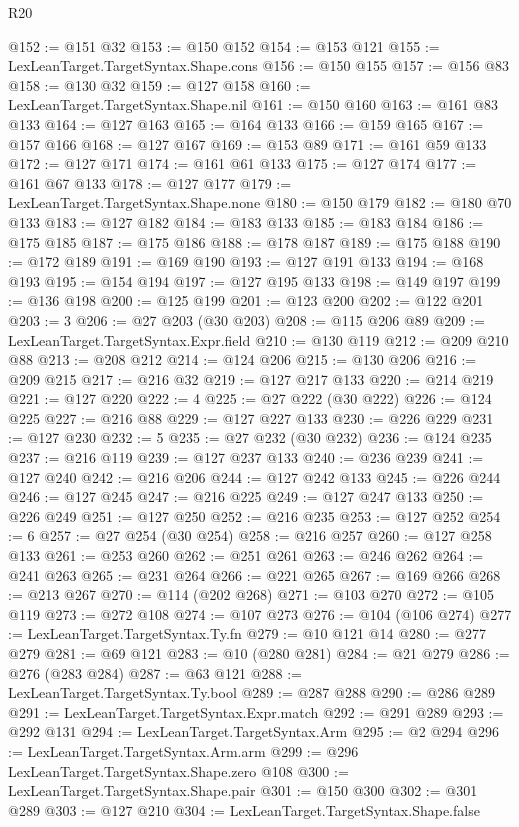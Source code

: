 \begin{lexlean}{R20}
\begin{coremodule}
{{{{{{{{{{{{{{{{{{{{{{{{{{{{{{{{{{{{{{{{{{{{{{{{{{{{{{{{{{{{{{{@152 := @151 @32
@153 := @150 @152
@154 := @153 @121
@155 := LexLeanTarget.TargetSyntax.Shape.cons
@156 := @150 @155
@157 := @156 @83
@158 := @130 @32
@159 := @127 @158
@160 := LexLeanTarget.TargetSyntax.Shape.nil
@161 := @150 @160
@163 := @161 @83 @133
@164 := @127 @163
@165 := @164 @133
@166 := @159 @165
@167 := @157 @166
@168 := @127 @167
@169 := @153 @89
@171 := @161 @59 @133
@172 := @127 @171
@174 := @161 @61 @133
@175 := @127 @174
@177 := @161 @67 @133
@178 := @127 @177
@179 := LexLeanTarget.TargetSyntax.Shape.none
@180 := @150 @179
@182 := @180 @70 @133
@183 := @127 @182
@184 := @183 @133
@185 := @183 @184
@186 := @175 @185
@187 := @175 @186
@188 := @178 @187
@189 := @175 @188
@190 := @172 @189
@191 := @169 @190
@193 := @127 @191 @133
@194 := @168 @193
@195 := @154 @194
@197 := @127 @195 @133
@198 := @149 @197
@199 := @136 @198
@200 := @125 @199
@201 := @123 @200
@202 := @122 @201
@203 := 3
@206 := @27 @203 (@30 @203)
@208 := @115 @206 @89
@209 := LexLeanTarget.TargetSyntax.Expr.field
@210 := @130 @119
@212 := @209 @210 @88
@213 := @208 @212
@214 := @124 @206
@215 := @130 @206
@216 := @209 @215
@217 := @216 @32
@219 := @127 @217 @133
@220 := @214 @219
@221 := @127 @220
@222 := 4
@225 := @27 @222 (@30 @222)
@226 := @124 @225
@227 := @216 @88
@229 := @127 @227 @133
@230 := @226 @229
@231 := @127 @230
@232 := 5
@235 := @27 @232 (@30 @232)
@236 := @124 @235
@237 := @216 @119
@239 := @127 @237 @133
@240 := @236 @239
@241 := @127 @240
@242 := @216 @206
@244 := @127 @242 @133
@245 := @226 @244
@246 := @127 @245
@247 := @216 @225
@249 := @127 @247 @133
@250 := @226 @249
@251 := @127 @250
@252 := @216 @235
@253 := @127 @252
@254 := 6
@257 := @27 @254 (@30 @254)
@258 := @216 @257
@260 := @127 @258 @133
@261 := @253 @260
@262 := @251 @261
@263 := @246 @262
@264 := @241 @263
@265 := @231 @264
@266 := @221 @265
@267 := @169 @266
@268 := @213 @267
@270 := @114 (@202 @268)
@271 := @103 @270
@272 := @105 @119
@273 := @272 @108
@274 := @107 @273
@276 := @104 (@106 @274)
@277 := LexLeanTarget.TargetSyntax.Ty.fn
@279 := @10 @121 @14
@280 := @277 @279
@281 := @69 @121
@283 := @10 (@280 @281)
@284 := @21 @279
@286 := @276 (@283 @284)
@287 := @63 @121
@288 := LexLeanTarget.TargetSyntax.Ty.bool
@289 := @287 @288
@290 := @286 @289
@291 := LexLeanTarget.TargetSyntax.Expr.match
@292 := @291 @289
@293 := @292 @131
@294 := LexLeanTarget.TargetSyntax.Arm
@295 := @2 @294
@296 := LexLeanTarget.TargetSyntax.Arm.arm
@299 := @296 LexLeanTarget.TargetSyntax.Shape.zero @108
@300 := LexLeanTarget.TargetSyntax.Shape.pair
@301 := @150 @300
@302 := @301 @289
@303 := @127 @210
@304 := LexLeanTarget.TargetSyntax.Shape.false
}}}}}}}}}}}}}}}}}}}}}}}}}}}}}}}}}}}}}}}}}}}}}}}}}}}}}}}}}}}}}}}
\end{coremodule}
\end{lexlean}
